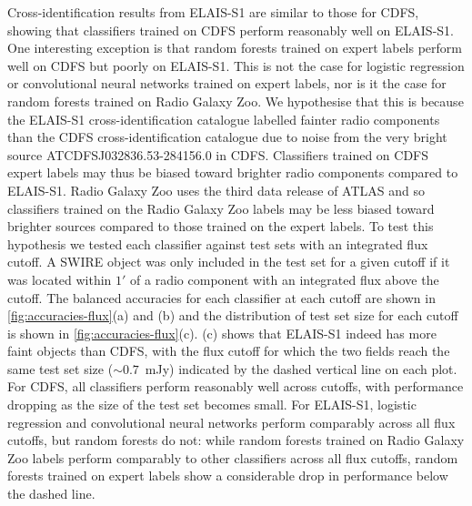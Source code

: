 \documentclass[fleqn,usenatbib,usedcolumn]{mnras}
\begin{document}
  Cross-identification results from ELAIS-S1 are similar to those for CDFS,
  showing that classifiers trained on CDFS perform reasonably well on
  ELAIS-S1. One interesting exception is that random forests trained on expert
  labels perform well on CDFS but poorly on ELAIS-S1. This is not the case for
  logistic regression or convolutional neural networks trained on expert
  labels, nor is it the case for random forests trained on Radio Galaxy Zoo.
  We hypothesise that this is because the ELAIS-S1 cross-identification
  catalogue \citep{middelberg08} labelled fainter radio components than the
  CDFS cross-identification catalogue \citep{norris06} due to noise from the
  very bright source ATCDFS\textunderscore{}J032836.53-284156.0 in CDFS.
  Classifiers trained on CDFS expert labels may thus be biased toward brighter
  radio components compared to ELAIS-S1. Radio Galaxy Zoo uses the third data
  release of ATLAS \citep{franzen15} and so classifiers trained on the Radio
  Galaxy Zoo labels may be less biased toward brighter sources compared to
  those trained on the expert labels. To test this hypothesis we tested each
  classifier against test sets with an integrated flux cutoff. A SWIRE object
  was only included in the test set for a given cutoff if it was located
  within $1'$ of a radio component with an integrated flux above the cutoff.
  The balanced accuracies for each classifier at each cutoff are shown in
  \autoref{fig:accuracies-flux}(a) and (b) and the distribution of test set
  size for each cutoff is shown in \autoref{fig:accuracies-flux}(c). (c) shows
  that ELAIS-S1 indeed has more faint objects than CDFS, with the flux cutoff
  for which the two fields reach the same test set size ($\sim 0.7$~mJy)
  indicated by the dashed vertical line on each plot. For CDFS, all
  classifiers perform reasonably well across cutoffs, with performance
  dropping as the size of the test set becomes small. For ELAIS-S1, logistic
  regression and convolutional neural networks perform comparably across all
  flux cutoffs, but random forests do not: while random forests trained on
  Radio Galaxy Zoo labels perform comparably to other classifiers across all
  flux cutoffs, random forests trained on expert labels show a considerable
  drop in performance below the dashed line.
\end{document}
